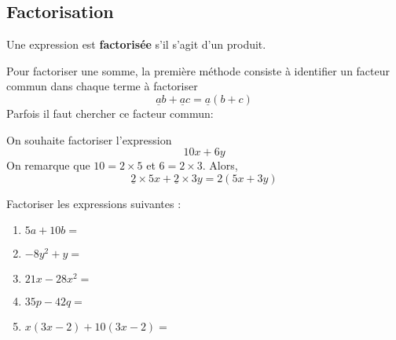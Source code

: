 \documentclass{poly}
\begin{document}
\newpage
\subsection{Factorisation}
\begin{definition}
Une expression est \textbf{factorisée} s'il s'agit d'un produit.
\end{definition}
\begin{method}
Pour factoriser une somme, la première méthode consiste à identifier un facteur commun dans chaque terme à factoriser
\begin{equation*}
\underline{a}b + \underline{a}c = \underline{a}(b + c)
\end{equation*}
Parfois il faut chercher ce facteur commun:
\end{method}
\begin{example}
On souhaite factoriser l'expression
\begin{equation*}
10x + 6y
\end{equation*}
On remarque que $10 = 2 \times 5$ et $6 = 2 \times 3$. Alors,
\begin{equation*}
\underline{2} \times 5x + \underline{2} \times 3 y = 2 (5x + 3y)
\end{equation*}
\end{example}
\begin{exercize}

Factoriser les expressions suivantes :
\begin{enumerate}[label=\emph{\alph*)}]
\item $5a + 10b =$ \answerline
\item $-8y^2 + y =$ \answerline
\item $21x - 28x^2 =$ \answerline
\item $35p - 42q =$ \answerline
\item $x(3x - 2) + 10(3x - 2) =$ \answerline
\end{enumerate}
\end{exercize}
\end{document}
